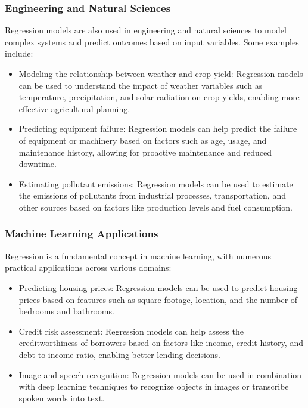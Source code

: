 \documentclass{beamer}
\begin{document}
\subsubsection{Engineering and Natural Sciences}

Regression models are also used in engineering and natural sciences to model complex systems and predict outcomes based on input variables. Some examples include:

\begin{itemize}
\item Modeling the relationship between weather and crop yield: Regression models can be used to understand the impact of weather variables such as temperature, precipitation, and solar radiation on crop yields, enabling more effective agricultural planning.
\item Predicting equipment failure: Regression models can help predict the failure of equipment or machinery based on factors such as age, usage, and maintenance history, allowing for proactive maintenance and reduced downtime.
\item Estimating pollutant emissions: Regression models can be used to estimate the emissions of pollutants from industrial processes, transportation, and other sources based on factors like production levels and fuel consumption.
\end{itemize}

\subsubsection{Machine Learning Applications}

Regression is a fundamental concept in machine learning, with numerous practical applications across various domains:

\begin{itemize}
\item Predicting housing prices: Regression models can be used to predict housing prices based on features such as square footage, location, and the number of bedrooms and bathrooms.
\item Credit risk assessment: Regression models can help assess the creditworthiness of borrowers based on factors like income, credit history, and debt-to-income ratio, enabling better lending decisions.
\item Image and speech recognition: Regression models can be used in combination with deep learning techniques to recognize objects in images or transcribe spoken words into text.
\end{itemize}
\end{document}
